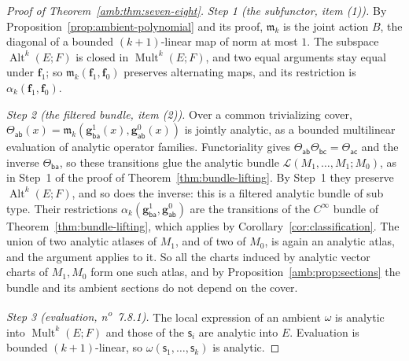 \documentclass[11pt]{amsart}
\theoremstyle{definition}
\theoremstyle{remark}
\numberwithin{equation}{section}
\newcommand{\cL}{\mathcal L}
\newcommand{\Alt}{\operatorname{Alt}}
\newcommand{\Mult}{\operatorname{Mult}}
\theoremstyle{plain}
\theoremstyle{definition}
\theoremstyle{plain}
\begin{document}
\begin{proof}[Proof of Theorem~\ref{amb:thm:seven-eight}]
\emph{Step 1 (the subfunctor, item (1)).} By Proposition~\ref{prop:ambient-polynomial} and its proof, $\mathfrak m_k$ is the joint action $B$, the diagonal of a bounded $(k+1)$\nobreakdash-linear map of norm at most $1$. The subspace $\Alt^k(E;F)$ is closed in $\Mult^k(E;F)$, and two equal arguments stay equal under $\mathbf f_1$; so $\mathfrak m_k(\mathbf f_1,\mathbf f_0)$ preserves alternating maps, and its restriction is $\alpha_k(\mathbf f_1,\mathbf f_0)$.

\emph{Step 2 (the filtered bundle, item (2)).} Over a common trivializing cover, $\Theta_{\mathsf{ab}}(x)=\mathfrak m_k(\mathbf g^1_{\mathsf{ba}}(x),\mathbf g^0_{\mathsf{ab}}(x))$ is jointly analytic, as a bounded multilinear evaluation of analytic operator families. Functoriality gives $\Theta_{\mathsf{ab}}\Theta_{\mathsf{bc}}=\Theta_{\mathsf{ac}}$ and the inverse $\Theta_{\mathsf{ba}}$, so these transitions glue the analytic bundle $\cL(M_1,\dots,M_1;M_0)$, as in Step~1 of the proof of Theorem~\ref{thm:bundle-lifting}. By Step~1 they preserve $\Alt^k(E;F)$, and so does the inverse: this is a filtered analytic bundle of sub type. Their restrictions $\alpha_k(\mathbf g^1_{\mathsf{ba}},\mathbf g^0_{\mathsf{ab}})$ are the transitions of the $C^\infty$ bundle of Theorem~\ref{thm:bundle-lifting}, which applies by Corollary~\ref{cor:classification}. The union of two analytic atlases of $M_1$, and of two of $M_0$, is again an analytic atlas, and the argument applies to it. So all the charts induced by analytic vector charts of $M_1,M_0$ form one such atlas, and by Proposition~\ref{amb:prop:sections} the bundle and its ambient sections do not depend on the cover.

\emph{Step 3 (evaluation, n\textsuperscript{o}~7.8.1).} The local expression of an ambient $\omega$ is analytic into $\Mult^k(E;F)$ and those of the $\mathsf s_i$ are analytic into $E$. Evaluation is bounded $(k+1)$\nobreakdash-linear, so $\omega(\mathsf s_1,\dots,\mathsf s_k)$ is analytic.


\end{proof}
\end{document}
